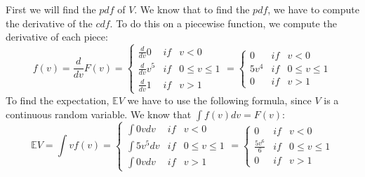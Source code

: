 First we will find the $pdf$ of $V$. We know that to find the $pdf$, we have to compute the derivative of the $cdf$. To do this on a piecewise function, we compute the derivative of each piece:
$$
f(v) = \frac{d}{dv}F(v) =
\left\{
\begin{matrix}
\frac{d}{dv} 0   & if & v < 0 \\[6pt]
\frac{d}{dv} v^5 & if & 0 \leq v \leq 1 \\[6pt]
\frac{d}{dv} 1   & if & v > 1
\end{matrix}
\right.
=
\left\{
\begin{matrix}
0   & if & v < 0 \\
5v^4 & if & 0 \leq v \leq 1 \\
0   & if & v > 1
\end{matrix}
\right.
$$
To find the expectation, $\mathbb{E}V$ we have to use the following formula, since $V$ is a continuous random variable. We know that $\int f(v)dv = F(v)$:
$$
\mathbb{E}V = \int v f(v) = 
\left\{
\begin{matrix}
\int 0v dv   & if & v < 0 \\
\int 5v^5 dv & if & 0 \leq v \leq 1 \\
\int 0v dv  & if & v > 1
\end{matrix}
\right.
=
\left\{
\begin{matrix}
0 & if & v < 0 \\
\frac{5v^6}{6} & if & 0 \leq v \leq 1 \\[6pt]
0 & if & v > 1
\end{matrix}
\right.
$$